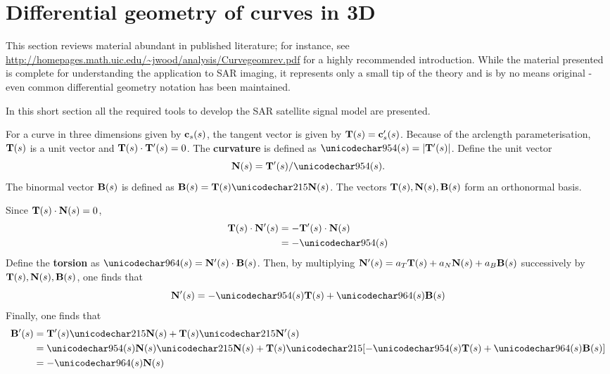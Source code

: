\section{Differential geometry of curves in 3D}
\label{sc:diffgeoreview}
This section reviews material abundant in published literature; for instance, see \url{http://homepages.math.uic.edu/~jwood/analysis/Curvegeomrev.pdf} for a highly recommended introduction. While the material presented is complete for understanding the application to SAR imaging, it represents only a small tip of the theory and is by no means original - even common differential geometry notation has been maintained.
\par
In this short section all the required tools to develop the SAR satellite signal model are presented.
\par
For a curve in three dimensions given by $\mathbf{c}_s(s)$, the tangent vector is given by $\mathbf{T}(s) = \mathbf{c}_s'(s)$. Because of the arclength parameterisation, $\mathbf{T}(s)$ is a unit vector and $\mathbf{T}(s)\cdot\mathbf{T}'(s)=0$. The \textbf{curvature} is defined as $\kappa(\parm) =\lvert\vct{T}'(\parm)\rvert$. Define the unit vector 
\begin{equation}
\vct{N}(\parm) = \vct{T}'(\parm)/\kappa(\parm). 
\end{equation}
The binormal vector $\mathbf{B}(s)$ is defined as $\vct{B}(\parm) = \vct{T}(\parm)\times\vct{N}(\parm)$. The vectors $\mathbf{T}(s), \mathbf{N}(s), \mathbf{B}(s)$ form an orthonormal basis.
\par
Since $\mathbf{T}(s)\cdot\mathbf{N}(s)=0$,
\begin{equation}
\begin{split}
 \vct{T}(\parm)\cdot\vct{N}'(\parm)&=-\vct{T}'(\parm)\cdot\vct{N}(\parm)\\
 &=-\kappa(\parm)
\end{split}
\end{equation}
Define the \textbf{torsion} as $\tau(\parm) = \vct{N}'(\parm)\cdot\vct{B}(\parm)$. Then, by multiplying $\mathbf{N}'(s)=a_T\mathbf{T}(s) + a_N\mathbf{N}(s) + a_B\mathbf{B}(s)$ successively by $\mathbf{T}(s),\mathbf{N}(s),\mathbf{B}(s)$, one finds that
\begin{equation}
 \vct{N}'(\parm) = -\kappa(\parm)\vct{T}(\parm)+\tau(\parm)\vct{B}(\parm)
\end{equation}
Finally, one finds that
\begin{equation}
\begin{split}
 \vct{B}'(\parm) &= \vct{T}'(\parm)\times\vct{N}(\parm) + \vct{T}(\parm)\times\vct{N}'(\parm)\\
 &=\kappa(\parm)\vct{N}(\parm)\times\vct{N}(\parm) + \vct{T}(\parm)\times[-\kappa(\parm)\vct{T}(\parm)+\tau(\parm)\vct{B}(\parm)]\\
 &=-\tau(\parm)\vct{N}(\parm)
 \end{split}
\end{equation}
